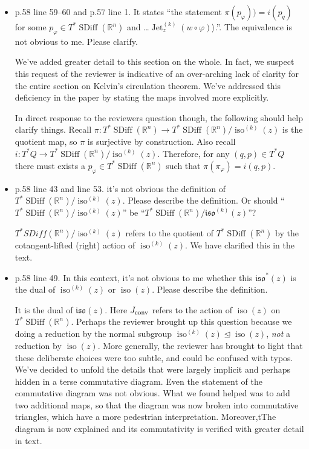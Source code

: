 \documentclass{article}
\def\R{\mathbb{R} }
\def\R{\mathbb{R} }
\DeclareMathOperator{\SDiff}{SDiff}
\DeclareMathOperator{\Jet}{Jet}
\DeclareMathOperator{\iso}{iso}
\begin{document}
\begin{itemize}
\item p.58 line 59--60 and p.57 line 1. It states ``the statement
  $\pi(p_\varphi)) = i(p_q)$ for some $p_\varphi \in T^*\SDiff(\R^n)$
  and \ldots $\Jet_z^{(k)}(w \circ \varphi)\rangle$.''.
  The equivalence is not obvious to me. Please clarify.
  
We've added greater detail to this section on the whole.
In fact, we suspect this request of the reviewer is indicative of an over-arching lack of clarity for the entire section on Kelvin's circulation theorem.
We've addressed this deficiency in the paper by stating the maps involved more explicitly.

In direct response to the reviewers question though, the following should help clarify things.
Recall $\pi: T^*\SDiff(\R^n) \to T^*\SDiff(\R^n) / \iso^{(k)}(z)$ is the quotient map, so $\pi$ is surjective by construction.
Also recall $i: T^*Q \to T^*\SDiff(\R^n) / \iso^{(k)}(z)$.
Therefore, for any $(q,p) \in T^*Q$ there must exists a $p_\varphi \in T^* \SDiff(\R^n)$ such that $\pi( \pi_\varphi) = i(q,p)$.

\item p.58 line 43 and line 53. it's not obvious the definition of
  $T^*\SDiff(\R^n)/\iso^{(k)}(z)$.
  Please describe the definition. Or should
  ``$T^*\SDiff(\R^n)/\iso^{(k)}(z)$''
  be ``$T^*\SDiff(\R^n)/\mathfrak{iso}^{(k)}(z)$''?

  $T^*SDiff(\R^n) / \iso^{(k)}(z)$ refers to the quotient of $T^*\SDiff(\R^n)$
  by the cotangent-lifted (right) action of
  $\iso^{(k)}(z)$. We have clarified this in the text.

\item p.58 line 49. In this context, it's not obvious to me whether
  this $\mathfrak{iso}^*(z)$ is the dual of $\iso^{(k)}(z)$ or
  $\iso(z)$. Please describe the definition.

  It is the dual of $\mathfrak{iso}(z)$.
  Here $J_{\rm conv}$ refers to the action of $\iso(z)$ on $T^* \SDiff(\R^n)$.
  Perhaps the reviewer brought up this question because we doing a reduction by the normal subgroup $\iso^{(k)}(z) \trianglelefteq \iso(z)$, \emph{not} a reduction by $\iso(z)$.
  More generally, the reviewer has brought to light that these deliberate choices were too subtle, and could be confused with typos.
  We've decided to unfold the details that were largely implicit and perhaps hidden in a terse commutative diagram.
  Even the statement of the commutative diagram was not obvious.
  What we found helped was to add two additional maps, so that the diagram was now broken into commutative triangles, which have a more pedestrian interpretation.
  Moreover,tThe diagram is now explained and its commutativity is verified with greater detail in text.


\end{itemize}
\end{document}
